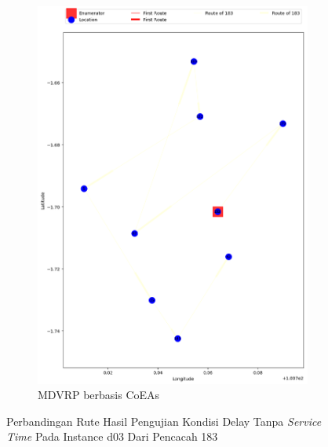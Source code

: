 \begin{figure}[H]
	\centering
	\begin{subfigure}[t]{\textwidth}
		\centering
		\includegraphics[width=\textwidth]{Resources/Images/delayed_3/real_m15_n100_delayed_3_183_coes}
		\caption{MDVRP berbasis CoEAs}
		\label{fig:real_m15_n100_delayed_3_183_coes}
	\end{subfigure}
	\caption{Perbandingan Rute Hasil Pengujian Kondisi Delay Tanpa \textit{Service Time} Pada Instance d03 Dari Pencacah 183}
	\label{fig:real_m15_n100_delayed_3_183}
\end{figure}



